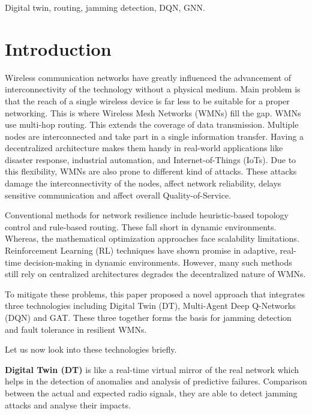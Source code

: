 \documentclass[conference]{IEEEtran}
\begin{document}
\begin{IEEEkeywords}
Digital twin, routing, jamming detection, DQN, GNN.
\end{IEEEkeywords}

\section{Introduction}

Wireless communication networks have greatly influenced the advancement of interconnectivity of the technology without a physical medium. Main problem is that the reach of a single wireless device is far less to be suitable for a proper networking. This is where Wireless Mesh Networks (WMNs) fill the gap. WMNs use multi-hop routing. This extends the coverage of data transmission. Multiple nodes are interconnected and take part in a single information transfer. Having a decentralized architecture makes them handy in real-world applications like disaster response, industrial automation, and Internet-of-Things (IoTs). Due to this flexibility, WMNs are also prone to different kind of attacks. These attacks damage the interconnectivity of the nodes, affect network reliability, delays sensitive communication and affect overall Quality-of-Service.

Conventional methods for network resilience include heuristic-based topology control and rule-based routing. These fall short in dynamic environments. Whereas, the mathematical optimization approaches face scalability limitations. Reinforcement Learning (RL) techniques have shown promise in adaptive, real-time decision-making in dynamic environments. However, many such methods still rely on centralized architectures degrades the decentralized nature of WMNs.

To mitigate these problems, this paper proposed a novel approach that integrates three technologies including Digital Twin (DT), Multi-Agent Deep Q-Networks (DQN) and GAT. These three together forms the basis for jamming detection and fault tolerance in resilient WMNs.

Let us now look into these technologies briefly.

\textbf{Digital Twin (DT)} is like a real-time virtual mirror of the real network which helps in the detection of anomalies and analysis of predictive failures. Comparison between the actual and expected radio signals, they are able to detect jamming attacks and analyse their impacts.
\end{document}
